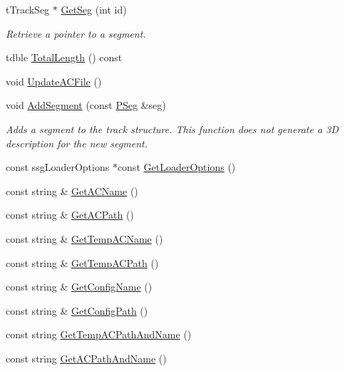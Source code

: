 \begin{DoxyCompactItemize}
\item 
t\-Track\-Seg $\ast$ \hyperlink{classprocedural_1_1_p_track_a719e653e1635d5cacfd9a07af0ae8e93}{Get\-Seg} (int id)
\begin{DoxyCompactList}\small\item\em Retrieve a pointer to a segment. \end{DoxyCompactList}\item 
tdble \hyperlink{classprocedural_1_1_p_track_a3c3fe0043980947c50f70b50fbb15e66}{Total\-Length} () const 
\item 
void \hyperlink{classprocedural_1_1_p_track_a588ce353de30074f2e8d046c210f440b}{Update\-A\-C\-File} ()
\item 
void \hyperlink{classprocedural_1_1_p_track_aa3a889ace632d1776e95aad1197faa64}{Add\-Segment} (const \hyperlink{classprocedural_1_1_p_seg}{P\-Seg} \&seg)
\begin{DoxyCompactList}\small\item\em Adds a segment to the track structure. This function does not generate a 3\-D description for the new segment. \end{DoxyCompactList}\item 
const ssg\-Loader\-Options $\ast$const \hyperlink{classprocedural_1_1_p_track_a4227f3afd5fb92c627dff2e97425d7ba}{Get\-Loader\-Options} ()
\item 
const string \& \hyperlink{classprocedural_1_1_p_track_a0d7034cc742106489dd38e7cf76fa974}{Get\-A\-C\-Name} ()
\item 
const string \& \hyperlink{classprocedural_1_1_p_track_a5b7370bf6ef72e88c55556e98e9d3d99}{Get\-A\-C\-Path} ()
\item 
const string \& \hyperlink{classprocedural_1_1_p_track_a167b31e32fe4c19fb35a04596416f5ca}{Get\-Temp\-A\-C\-Name} ()
\item 
const string \& \hyperlink{classprocedural_1_1_p_track_a3b2ff7813589aad36bbcff2a7374ac0d}{Get\-Temp\-A\-C\-Path} ()
\item 
const string \& \hyperlink{classprocedural_1_1_p_track_ab423a5b741fae83631cb818a88d0a4c4}{Get\-Config\-Name} ()
\item 
const string \& \hyperlink{classprocedural_1_1_p_track_ac0c98404d985e4586d60d44f1c5657a6}{Get\-Config\-Path} ()
\item 
const string \hyperlink{classprocedural_1_1_p_track_a295308260593ff8009a54ed12b20d756}{Get\-Temp\-A\-C\-Path\-And\-Name} ()
\item 
const string \hyperlink{classprocedural_1_1_p_track_a88577f90aca2980f5696f245bc0b16fa}{Get\-A\-C\-Path\-And\-Name} ()

\end{DoxyCompactItemize}
